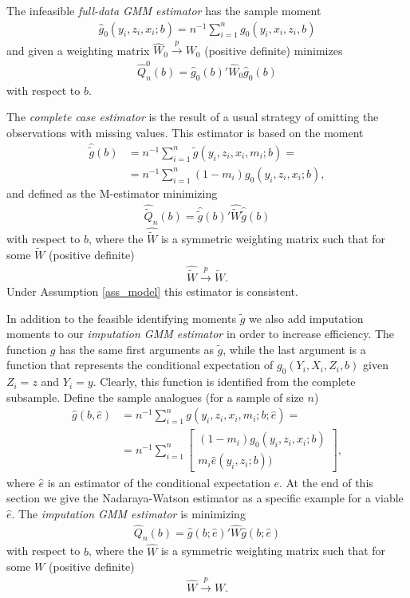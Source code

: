 \documentclass{article}
\theoremstyle{definition}
\theoremstyle{remark}
\begin{document}
The infeasible \emph{full-data GMM estimator} has the sample moment
\begin{align}
\hat{g}_0(y_i,z_i,x_i;b) = n^{-1}\sum_{i=1}^n g_0(y_i,x_i,z_i,b)
\end{align}
and given a weighting matrix $\hat{W}_0\stackrel{p}{\rightarrow} W_0$ (positive definite) minimizes
\begin{align}
\hat{Q}^0_n(b)= \hat{g}_0(b)'\hat{W}_0\hat{g}_0(b)
\end{align}
with respect to $b$.

The \textit{complete case estimator} is the result of a usual strategy of omitting the observations with missing values. This estimator is based on the moment
\begin{align}
\hat{\tilde{g}}(b)&=n^{-1}\sum_{i=1}^n \tilde{g}(y_i,z_i,x_i, m_i; b)= \\
&=n^{-1}\sum_{i=1}^n
(1-m_i) g_0(y_i,z_i,x_i; b), \nonumber %
\end{align}
and defined as the M-estimator minimizing
\begin{align}
\hat{\tilde{Q}}_n(b)= \hat{\tilde{g}}(b)'\hat{\tilde{W}}\hat{\tilde{g}}(b)
\end{align}
with respect to $b$, where the $\hat{\tilde{W}}$ is a symmetric weighting matrix such that for some $\tilde{W}$ (positive definite)
\begin{align}
\hat{\tilde{W}} \stackrel{p}{\rightarrow}\tilde{W}.
\end{align}
Under Assumption \ref{ass_model} this estimator is consistent. 

In addition to the feasible identifying moments $\tilde{g}$ we also add imputation moments to our \emph{imputation GMM estimator} in order to increase efficiency. The function $g$ has the same first arguments as $\tilde{g}$, while the last argument is a function that represents the conditional expectation of $g_0(Y_i, X_i, Z_i, b)$ given $Z_i=z$ and $Y_i=y$. Clearly, this function is identified from the complete subsample. Define the sample analogues (for a sample of size $n$)
\begin{align}
    \hat{g}(b, \hat{e})&=n^{-1}\sum_{i=1}^n g(y_i,z_i,x_i,m_i; b; \hat{e})= \\
    &=n^{-1}\sum_{i=1}^n\left[\begin{array}{c}
        (1-m_i) g_0(y_i,z_i,x_i; b)  \\
         m_i \hat{e}(y_i, z_i; b))
    \end{array}\right], \nonumber
\end{align}
where $\hat{e}$ is an estimator of the conditional expectation $e$. At the end of this section we give the Nadaraya-Watson estimator as a specific example for a viable $\hat{e}$. The \textit{imputation GMM estimator} is minimizing
\begin{align}
    \hat{Q}_n(b)= \hat{g}(b;\hat{e})'\hat{W}\hat{g}(b;\hat{e})
\end{align}
with respect to $b$, where the $\hat{W}$ is a symmetric weighting matrix such that for some $W$ (positive definite)
\begin{align}
    \hat{W} \stackrel{p}{\rightarrow}W.
\end{align}
\end{document}
